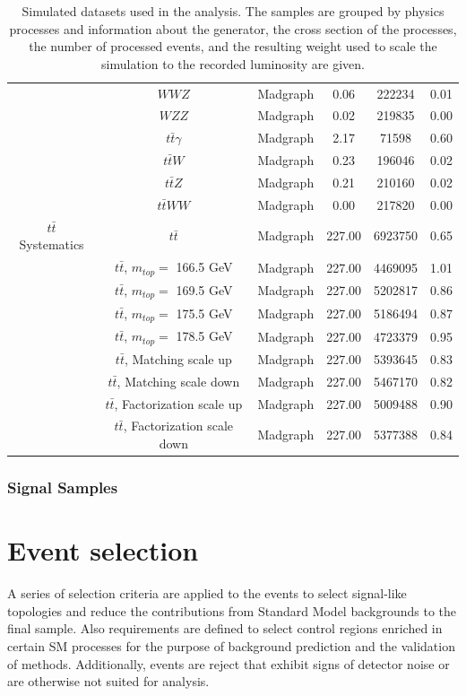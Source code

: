 \begin{table}
\begin{center}
\begin{tabular}{c|c|c|c|c|c}
 & $WWZ$ & Madgraph & 0.06 & 222234 & 0.01 \\
 & $WZZ$ & Madgraph & 0.02 & 219835 & 0.00 \\
 & $t\bar{t}\gamma$ & Madgraph & 2.17 & 71598 & 0.60 \\
 & $t\bar{t}W$ & Madgraph & 0.23 & 196046 & 0.02 \\
 & $t\bar{t}Z$ & Madgraph & 0.21 & 210160 & 0.02 \\
 & $t\bar{t}WW$ & Madgraph & 0.00 & 217820 & 0.00 \\
\hline 
$t\bar{t}$ Systematics & $t\bar{t}$ & Madgraph & 227.00 & 6923750 & 0.65 \\
 & $t\bar{t}$, $m_{top} =$ 166.5 GeV & Madgraph & 227.00 & 4469095 & 1.01 \\
 & $t\bar{t}$, $m_{top} =$ 169.5 GeV & Madgraph & 227.00 & 5202817 & 0.86 \\
 & $t\bar{t}$, $m_{top} =$ 175.5 GeV & Madgraph & 227.00 & 5186494 & 0.87 \\
 & $t\bar{t}$, $m_{top} =$ 178.5 GeV & Madgraph & 227.00 & 4723379 & 0.95 \\
 & $t\bar{t}$, Matching scale up & Madgraph & 227.00 & 5393645 & 0.83 \\
 & $t\bar{t}$, Matching scale down & Madgraph & 227.00 & 5467170 & 0.82 \\
 & $t\bar{t}$, Factorization scale up & Madgraph & 227.00 & 5009488 & 0.90 \\
 & $t\bar{t}$, Factorization scale down & Madgraph & 227.00 & 5377388 & 0.84 \\

\end{tabular}
\caption{Simulated datasets used in the analysis. The samples are grouped by physics processes and information about the generator, the cross section of the processes, the number of processed events, and the resulting weight used to scale the simulation to the recorded luminosity are given.}
\label{tab:MCSamples}
\end{center}
\end{table}

\subsubsection{Signal Samples}

\section{Event selection}
A series of selection criteria are applied to the events to select signal-like topologies and reduce the contributions from Standard Model backgrounds to the final sample. Also requirements are defined to select control regions enriched in certain SM processes for the purpose of background prediction and the validation of methods. Additionally, events are reject that exhibit signs of detector noise or are otherwise not suited for analysis. 
